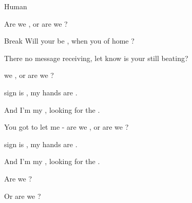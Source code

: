 \begin{SBSong}{Human}
\begin{SBChorus}
    Are we ,  or are we ? 
  \end{SBChorus}
  \begin{SBBracket}{Break}
    Will your  be , when you  of home ?

    There  no message  receiving, let  know is your  still beating?
  \end{SBBracket}
  \CBPageBrk
  \begin{SBChorus}
     we ,  or are we ?
    
     sign is ,  my hands are .
    
    And I'm  my , looking for the .  
    
  \end{SBChorus}
  \begin{SBChorus}
    You got to let me  - are we ,  or are we ?
    
     sign is ,  my hands are .

    And I'm  my , looking for the . 
    
    Are we ?   

    Or are we ?   
    
  \end{SBChorus}
 \end{SBSong}